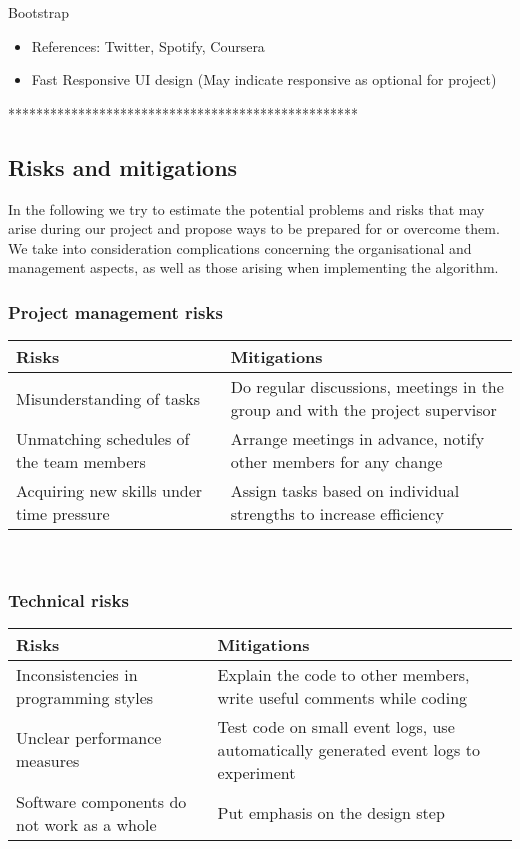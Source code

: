\documentclass[notitlepage]{article}
\begin{document}
\begin{flushleft}
\large{Bootstrap}
\begin{itemize}
	\item References: Twitter, Spotify, Coursera
	\item Fast Responsive UI design (May indicate responsive as optional for project)
\end{itemize}

{\color{gray} **************************************************}


\subsection{Risks and mitigations}
In the following we try to estimate the potential problems and risks that may arise during our project and propose ways to be prepared for or overcome them.
We take into consideration complications concerning the organisational and management aspects, as well as those arising when implementing the algorithm.

\subsubsection{Project management risks}

\begin{tabularx}{15cm}{|X|X|}
\hline
\textbf{Risks} &\textbf{Mitigations}\\
\hline
Misunderstanding of tasks & Do regular discussions, meetings in the group and with the project supervisor\\
\hline
Unmatching schedules of the team members & Arrange meetings in advance, notify other members for any change  \\
\hline
Acquiring new skills under time pressure & Assign tasks based on individual strengths to increase efficiency \\ 
\hline
\end{tabularx}\\ 


\subsubsection{Technical risks}

\begin{tabularx}{15cm}{|X|X|}
\hline
\textbf{Risks} &\textbf{Mitigations}\\
\hline
Inconsistencies in programming styles & Explain the code to other members, write useful comments while coding\\
\hline
Unclear performance measures & Test code on small event logs, use automatically generated event logs to experiment \\
\hline
Software components do not work as a whole & Put emphasis on the design step \\ 
\hline
\end{tabularx}







\end{flushleft}
\end{document}
